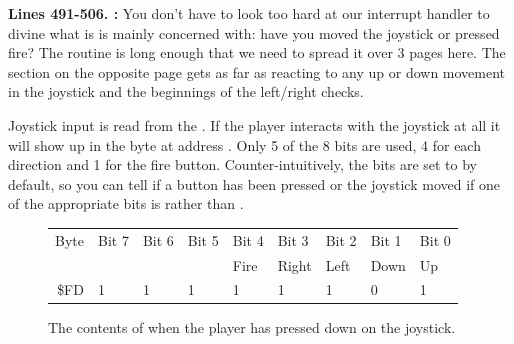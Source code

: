 \textbf{Lines 491-506. :}  You don't have to look too hard at our interrupt handler
to divine what is is mainly concerned with: have you moved the joystick or pressed fire? The routine is long enough
that we need to spread it over 3 pages here. The section on the opposite page gets as far as reacting to any up or
down movement in the joystick and the beginnings of the left/right checks. 

Joystick input is read from the . If the player interacts with the joystick at all it will
show up in the byte at address . Only 5 of the 8 bits are used, 4 for each direction and 1 for the fire button.
Counter-intuitively, the bits are set to  by default, so you can tell if a button has been pressed or the joystick moved
if one of the appropriate bits is  rather than .

\begin{figure}[H]
  {
    \setlength{\tabcolsep}{3.0pt}
    \setlength\cmidrulewidth{\heavyrulewidth} %
    \begin{adjustbox}{width=7cm,center}

      \begin{tabular}{rllllllll}
        \toprule
        Byte & Bit 7 & Bit 6 & Bit 5 & Bit 4 & Bit 3 & Bit 2 & Bit 1 & Bit 0        \\
             &       &       &       & Fire  & Right & Left  & Down  & Up           \\
        \midrule
        \$FD & 1 & 1 & 1 & 1 & 1 & 1 & 0 & 1 \\
        \bottomrule
      \end{tabular}
    \end{adjustbox}
  }\caption*{The contents of  when the player has pressed down on the joystick.}
\end{figure}

